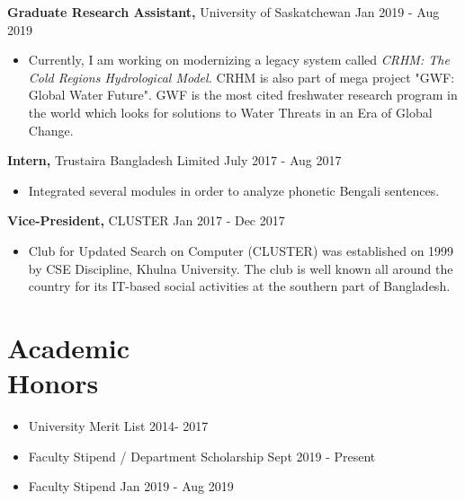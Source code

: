 \documentclass[margin]{res}
\begin{document}
\begin{resume}
\begin{itemize}
 \end{itemize}
 
 {\bf Graduate Research Assistant,} University of Saskatchewan 
 \hfill Jan 2019 - Aug 2019
 \begin{itemize} \itemsep -2pt  %
 \item Currently, I am working on modernizing a legacy system called \textit{CRHM: The Cold Regions Hydrological Model.}  CRHM is also part of mega project "GWF: Global Water Future". GWF is the most cited freshwater research program in the world which looks for solutions to Water Threats in an Era of Global Change.
 
 \end{itemize}

 {\bf Intern,} Trustaira Bangladesh Limited \hfill July 2017 - Aug 2017
 \begin{itemize} \itemsep -2pt  %
 \item Integrated several modules in order to analyze phonetic Bengali sentences.\href{https://techfoxweb.wordpress.com/2017/07/24/banglish-sentiment-analysis/}{\faWordpress }
 
 \end{itemize}
 
{\bf Vice-President,} CLUSTER \hfill  Jan 2017 - Dec 2017
\begin{itemize} \itemsep -2pt %
\item Club for Updated Search on Computer (CLUSTER) was established on 1999 by CSE Discipline, Khulna University. The club is well known all around the country for its IT-based social activities at the southern part of Bangladesh. 

\end{itemize}

 \section{Academic \\ Honors}
 
 \begin{itemize}
     \item University Merit List \hfill 2014- 2017 
     \item Faculty Stipend / Department Scholarship \hfill Sept 2019 - Present
     \item Faculty Stipend  \hfill Jan 2019 - Aug 2019
 \end{itemize}{}
 


\end{resume}
\end{document}
